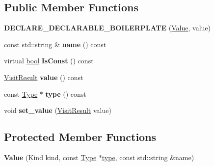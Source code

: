 \subsection*{Public Member Functions}
\begin{DoxyCompactItemize}
\item 
\mbox{\label{classv8_1_1internal_1_1torque_1_1Value_a715c56f8a85e189f616f35030cd6267c}} 
{\bfseries D\+E\+C\+L\+A\+R\+E\+\_\+\+D\+E\+C\+L\+A\+R\+A\+B\+L\+E\+\_\+\+B\+O\+I\+L\+E\+R\+P\+L\+A\+TE} (\mbox{\hyperlink{classv8_1_1internal_1_1torque_1_1Value}{Value}}, value)
\item 
\mbox{\label{classv8_1_1internal_1_1torque_1_1Value_a9ff763ddd6bfe11157fbc0395e50f85b}} 
const std\+::string \& {\bfseries name} () const
\item 
\mbox{\label{classv8_1_1internal_1_1torque_1_1Value_ae8b387a18456b276922cea523888396a}} 
virtual \mbox{\hyperlink{classbool}{bool}} {\bfseries Is\+Const} () const
\item 
\mbox{\label{classv8_1_1internal_1_1torque_1_1Value_a8ebdbbb57926c88e8df542ee04a790ff}} 
\mbox{\hyperlink{classv8_1_1internal_1_1torque_1_1VisitResult}{Visit\+Result}} {\bfseries value} () const
\item 
\mbox{\label{classv8_1_1internal_1_1torque_1_1Value_ad672083c22326e292476f15cb29dba21}} 
const \mbox{\hyperlink{classv8_1_1internal_1_1torque_1_1Type}{Type}} $\ast$ {\bfseries type} () const
\item 
\mbox{\label{classv8_1_1internal_1_1torque_1_1Value_aa4d5947aac24834f86aa15cbe93e9592}} 
void {\bfseries set\+\_\+value} (\mbox{\hyperlink{classv8_1_1internal_1_1torque_1_1VisitResult}{Visit\+Result}} value)
\end{DoxyCompactItemize}
\subsection*{Protected Member Functions}
\begin{DoxyCompactItemize}
\item 
\mbox{\label{classv8_1_1internal_1_1torque_1_1Value_a9019ce7a2812e927edc511119dcd368a}} 
{\bfseries Value} (Kind kind, const \mbox{\hyperlink{classv8_1_1internal_1_1torque_1_1Type}{Type}} $\ast$\mbox{\hyperlink{classstd_1_1conditional_1_1type}{type}}, const std\+::string \&name)
\end{DoxyCompactItemize}
